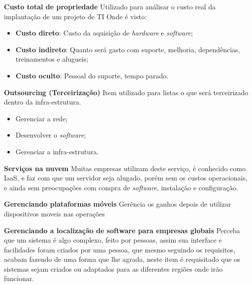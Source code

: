\documentclass[
	12pt,				%
	openany,			%
	a4paper,			%
	chapter=TITLE,		%
	section=TITLE,		%
	english,
	brazil				%
]{abntex2}
\begin{document}
\begin{itemize}
\begin{itemize}
\begin{itemize}
	\textbf{Custo total de propriedade}
		Utilizado para análisar o custo real da implantação de um projeto de TI
		Onde é visto:
		\begin{itemize}
			\item[] \textbf{Custo direto}: Custo da aquisição de \textit{hardware} e \textit{software};
			\item[] \textbf{Custo indireto}: Quanto será gasto com suporte, melhoria, dependências, treinamentos e alugueis;
			\item[] \textbf{Custo oculto}: Pessoal do suporte, tempo parado.
		\end{itemize}

	\textbf{Outsourcing (Terceirização)}
		Item utilizado para listas o que será terceirizado dentro da infra-estrutura.
		\begin{itemize}
			\item Gerenciar a rede;
			\item Desenvolver o \textit{software};
			\item Gerenciar a infra-estrutura.
		\end{itemize}

	\textbf{Serviços na nuvem}
		Muitas empresas utilizam deste serviço, é conhecido como IaaS, e faz com que um servidor seja alugado, porém sem os custos operacionais, e ainda sem preocupações com compra de \textit{software}, instalação e configuração.

	\textbf{Gerenciando plataformas móveis}
		Gerência os ganhos depois de utilizar dispositivos moveis nas operações

	\textbf{Gerenciando a localização de software para empresas globais}
		Perceba que um sistema é algo complexo, feito por pessoas, assim sua interface e facilidades foram criados por uma pessoa, que mesmo seguindo os requisitos, acabam fazendo de uma forma que lhe agrada, neste item é requisitado que os sistemas sejam criados ou adaptados para as diferentes regiões onde irão funcionar.



\end{itemize}
\end{itemize}
\end{itemize}
\end{document}
